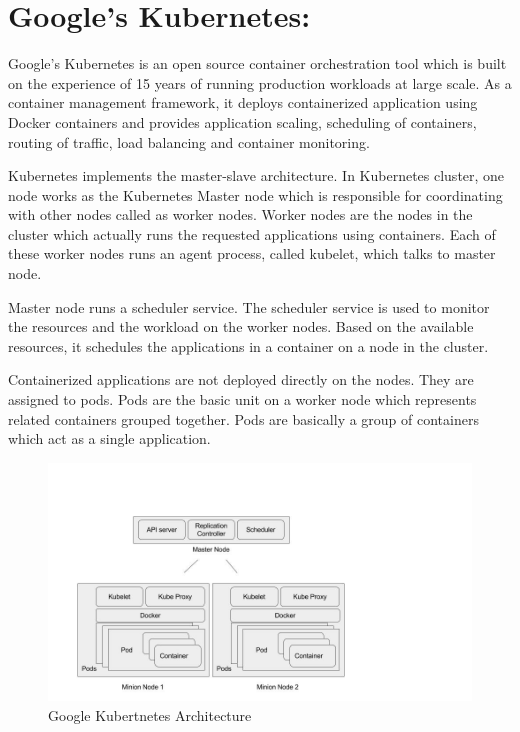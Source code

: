 \section{Google's Kubernetes:}
\label{sec:kubernetes}
Google's Kubernetes is an open source container orchestration tool which is built on the experience of 15 years of running production workloads at large scale. As a container management framework, it deploys containerized application using Docker containers and provides application scaling, scheduling of containers, routing of traffic, load balancing and container monitoring. 

Kubernetes implements the master-slave architecture. In Kubernetes cluster, one node works as the Kubernetes Master node which is responsible for coordinating with other nodes called as worker nodes. Worker nodes are the nodes in the cluster which actually runs the requested applications using containers. Each of these worker nodes runs an agent process, called kubelet, which talks to master node.

Master node runs a scheduler service. The scheduler service is used to monitor the resources and the workload on the worker nodes. Based on the available resources, it schedules the applications in a container on a node in the cluster. 

Containerized applications are not deployed directly on the nodes. They are assigned to pods. Pods are the basic unit on a worker node which represents related containers grouped together. Pods are basically a group of containers which act as a single application.

\begin{figure}
\centering
\includegraphics[scale=0.5]{./fig/kubernetes}
\caption{Google Kubertnetes Architecture}
\label{fig:kubernetesArch}
\end{figure}

